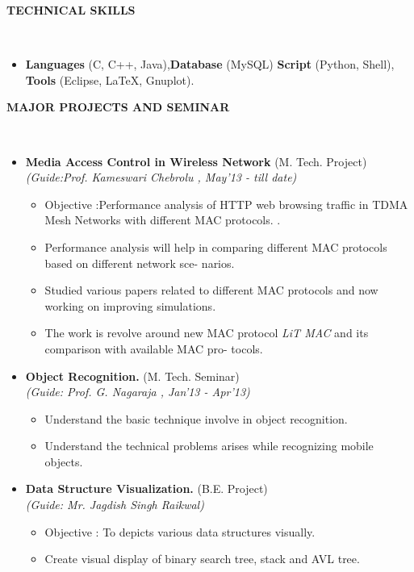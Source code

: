 \documentclass[letterpaper,10pt]{article}
\newcommand{\isep}{-2 pt}
\newcommand{\lsep}{-0.5cm}
\newcommand{\resheading}[1]{{\small \colorbox{mygrey}{\begin{minipage}{0.975\textwidth}{\textbf{#1 \vphantom{p\^{E}}}}\end{minipage}}}}
\begin{document}
\resheading{\textbf{TECHNICAL SKILLS} }\\[\lsep]
\begin{itemize}
\item \noindent \textbf{Languages} (C, C++, Java),\textbf{Database} (MySQL) \textbf{Script} (Python, Shell), \textbf{Tools} (Eclipse, \LaTeX, Gnuplot).
\end{itemize}

\resheading{\textbf{MAJOR PROJECTS AND SEMINAR} }\\[\lsep]
\begin{itemize}
\item \textbf{Media Access Control in Wireless Network
} (M. Tech. Project) \\
 \emph{(Guide:Prof. Kameswari Chebrolu
, May'13 - till date)} \\[-0.6cm]
	\begin{itemize}\itemsep \isep
	\item Objective :Performance analysis of HTTP web browsing traffic in TDMA Mesh Networks with different
MAC protocols.
.
	\item Performance analysis will help in comparing different MAC protocols based on different network sce-
narios.

	\item Studied various papers related to different MAC protocols and now working on improving simulations.

	\item The work is revolve around new MAC protocol \emph{LiT MAC} and its comparison with available MAC pro-
tocols.

	\end{itemize}

\item \textbf{Object Recognition.
} (M. Tech. Seminar) \\
 \emph{(Guide: Prof. G. Nagaraja
, Jan'13 - Apr'13)} \\[-0.6cm]
	\begin{itemize}\itemsep \isep
	\item Understand the basic technique involve in object recognition.
	\item Understand the technical problems arises while recognizing mobile objects.
	\end{itemize}

\item \textbf{Data Structure Visualization.} (B.E. Project) \\ 
 \emph{(Guide: Mr. Jagdish Singh Raikwal)} 
 \\[-0.6cm]
	\begin{itemize}\itemsep \isep
	\item Objective : To depicts various data structures visually.
	\item Create visual display of binary search tree, stack and AVL tree.
	\end{itemize}
\end{itemize}
\end{document}
